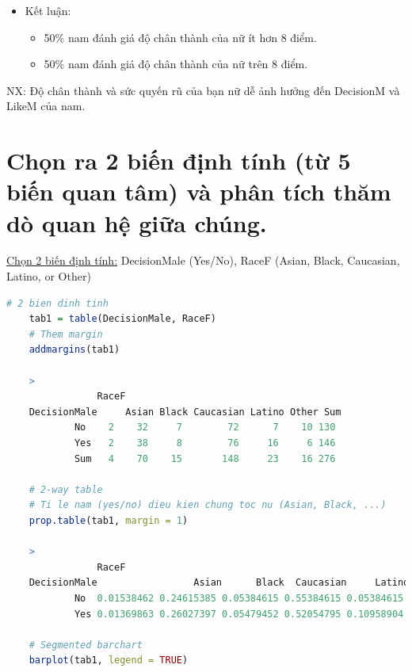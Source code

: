 \documentclass[a4paper,12pt]{article}
\begin{document}
\begin{enumerate}[label = {\alph*)}]
\begin{itemize}
\begin{itemize}
						\item Kết luận:
							\begin{itemize}
								\item 50\% nam đánh giá độ chân thành của nữ ít hơn 8 điểm.
								\item 50\% nam đánh giá độ chân thành của nữ trên 8 điểm.
							\end{itemize}
						
					\end{itemize}
					
				
				NX: Độ chân thành và sức quyến rũ của bạn nữ dễ ảnh hưởng đến DecisionM và LikeM của nam.
					
				\end{itemize}
				
		\end{enumerate}
	
	\section{Chọn ra 2 biến định tính (từ 5 biến quan tâm) và phân tích thăm dò quan hệ giữa chúng.}
	
	\underline{Chọn 2 biến định tính:} DecisionMale (Yes/No), RaceF (Asian, Black, Caucasian, Latino, or Other)\\
	
	
	\begin{lstlisting}[language = R]
	# 2 bien dinh tinh
	tab1 = table(DecisionMale, RaceF)
	# Them margin
	addmargins(tab1)
	
	>
	            RaceF
	DecisionMale     Asian Black Caucasian Latino Other Sum
			No    2    32     7        72      7    10 130
			Yes   2    38     8        76     16     6 146
			Sum   4    70    15       148     23    16 276
	
	# 2-way table
	# Ti le nam (yes/no) dieu kien chung toc nu (Asian, Black, ...)
	prop.table(tab1, margin = 1)
	
	>
	            RaceF
	DecisionMale                 Asian      Black  Caucasian     Latino      Other
			No  0.01538462 0.24615385 0.05384615 0.55384615 0.05384615 0.07692308
			Yes 0.01369863 0.26027397 0.05479452 0.52054795 0.10958904 0.04109589
	
	# Segmented barchart
	barplot(tab1, legend = TRUE)
	\end{lstlisting}
	
\end{document}
